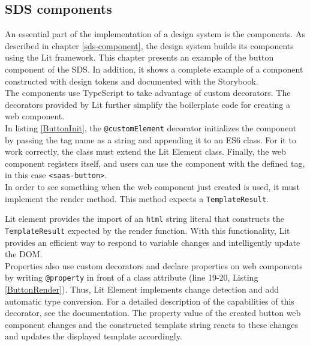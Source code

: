 \subsection{\ac{SDS} components}\label{sds_button}
An essential part of the implementation of a design system is the components. As described in chapter \ref{sds-component}, the design system builds its components using the Lit framework. This chapter presents an example of the button component of the \ac{SDS}. In addition, it shows a complete example of a component constructed with design tokens and documented with the Storybook.  \\
The components use TypeScript to take advantage of custom decorators. The decorators provided by Lit further simplify the boilerplate code for creating a web component. \\

In listing \ref{ButtonInit}, the \texttt{@customElement} decorator initializes the component by passing the tag name as a string and appending it to an \ac{ES6} class. For it to work correctly, the class must extend the Lit Element class. Finally, the web component registers itself, and users can use the component with the defined tag, in this case \texttt{<saas-button>}. \\
In order to see something when the web component just created is used, it must implement the render method. This method expects a \texttt{TemplateResult}. 

Lit element provides the import of an \texttt{html} string literal that constructs the \texttt{TemplateResult} expected by the render function. With this functionality, Lit provides an efficient way to respond to variable changes and intelligently update the \ac{DOM}. \\
Properties also use custom decorators and declare properties on web components by writing \texttt{@property} in front of a class attribute (line 19-20, Listing \ref{ButtonRender}). Thus, Lit Element implements change detection and add automatic type conversion. For a detailed description of the capabilities of this decorator, see the documentation. The property value of the created button web component changes and the constructed template string reacts to these changes and updates the displayed template accordingly. \\
